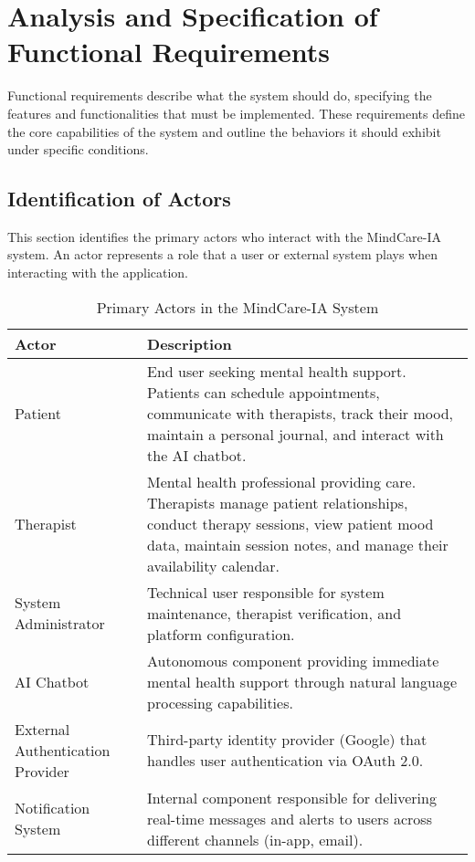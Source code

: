 \section{Analysis and Specification of Functional Requirements}
Functional requirements describe what the system should do, specifying the features and functionalities that must be implemented. These requirements define the core capabilities of the system and outline the behaviors it should exhibit under specific conditions.

\subsection{Identification of Actors}
This section identifies the primary actors who interact with the MindCare-IA system. An actor represents a role that a user or external system plays when interacting with the application.

\begin{table}[h]
\centering
\begin{tabular}{|p{3cm}|p{10cm}|}
\hline
\textbf{Actor} & \textbf{Description} \\
\hline
Patient & End user seeking mental health support. Patients can schedule appointments, communicate with therapists, track their mood, maintain a personal journal, and interact with the AI chatbot. \\
\hline
Therapist & Mental health professional providing care. Therapists manage patient relationships, conduct therapy sessions, view patient mood data, maintain session notes, and manage their availability calendar. \\
\hline
System Administrator & Technical user responsible for system maintenance, therapist verification, and platform configuration. \\
\hline
AI Chatbot & Autonomous component providing immediate mental health support through natural language processing capabilities. \\
\hline
External Authentication Provider & Third-party identity provider (Google) that handles user authentication via OAuth 2.0. \\
\hline
Notification System & Internal component responsible for delivering real-time messages and alerts to users across different channels (in-app, email). \\
\hline
\end{tabular}
\caption{Primary Actors in the MindCare-IA System}
\end{table}

